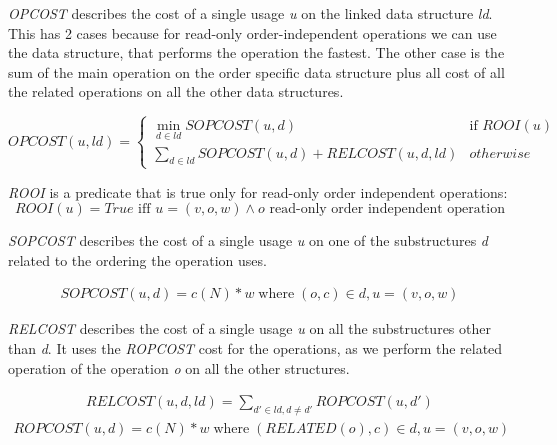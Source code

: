 \documentclass[a4paper,11pt]{article}
\begin{document}
			\emph{OPCOST} describes the cost of a single usage \emph{u} on the linked data structure \emph{ld}. This has 2 cases because for read-only order-independent operations we can use the data structure, that performs the operation the fastest. The other case is the sum of the main operation on the order specific data structure plus all cost of all the related operations on all the other data structures.

            \begin{equation} \label{eqn:opcost}
                OPCOST(u, ld) = \begin{cases}
   						\displaystyle \min_{d \in ld} \mathit{SOPCOST}(u,d) & \text{if } ROOI(u)\\
   						\displaystyle \sum_{d \in ld} \mathit{SOPCOST}(u,d) + \mathit{RELCOST}(u, d, ld) & \mathit{otherwise}
  					\end{cases}
            \end{equation}

            \emph{ROOI} is a predicate that is true only for read-only order independent operations:
            \begin{equation}
                \mathit{ROOI}(u) = \mathit{True} \text{ iff }u = (v, o, w) \wedge o \text{ read-only order independent operation}
            \end{equation}

            \emph{SOPCOST} describes the cost of a single usage \emph{u} on one of the substructures \emph{d}
            related to the ordering the operation uses.

			\begin{eqnarray}
				\mathit{SOPCOST}(u,d) = c(N) * w \; \textrm{where} \; (o,c) \in d, u = (v, o, w)
            \end{eqnarray}

			\emph{RELCOST} describes the cost of a single usage \emph{u} on all the substructures other than \emph{d}. It uses the \emph{ROPCOST} cost for the operations, as we perform the related operation of the operation \emph{o} on all the other structures.

            \begin{eqnarray}
                \mathit{RELCOST}(u, d, ld) = \sum_{d' \in ld, d \neq d'} \mathit{ROPCOST}(u,d')
            \end{eqnarray}
            \begin{eqnarray}
                \mathit{ROPCOST}(u,d) = c(N) * w \; \textrm{where} \; (\mathit{RELATED}(o),c) \in d, u = (v, o, w)
            \end{eqnarray}
\end{document}
